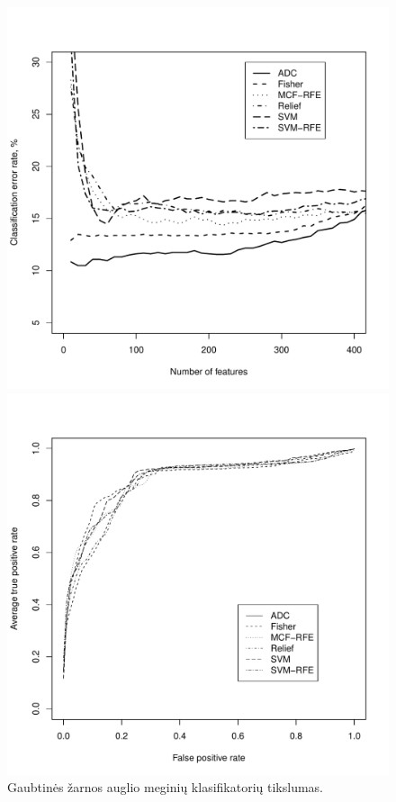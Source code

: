 \begin{figure}[H]
\begin{minipage}[b]{0.45\linewidth}
\centering
\includegraphics[width=.9\textwidth]{../bachelor/images/nncolon_classification.pdf}
\caption{Gaubtinės žarnos auglio meginių klasifikatorių tikslumas.}
\label{fig:class_colon}
\end{minipage}
\hspace{0.2cm}
\begin{minipage}[b]{0.45\linewidth}
\centering
\includegraphics[width=.85\textwidth]{../bachelor/images/nncolon_roc.pdf}

\end{minipage}
\end{figure}
